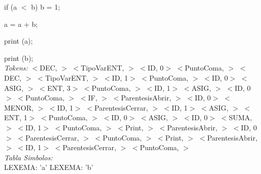 \documentclass[a4paper, 12pt]{article}
\begin{document}
 if (a  $<$  b) b  =  1;
 
 a = a  +  b;
 
print (a);

print (b);
\medskip\\
\emph{Tokens:}
 $<$DEC, $>$ 
 $<$TipoVarENT, $>$ 
 $<$ID, 0$>$ 
 $<$PuntoComa, $>$ 
 $<$DEC, $>$ 
 $<$TipoVarENT, $>$ 
 $<$ID, 1$>$ 
 $<$PuntoComa, $>$ 
 $<$ID, 0$>$ 
 $<$ASIG, $>$ 
 $<$ENT, 3$>$ 
 $<$PuntoComa, $>$ 
 $<$ID, 1$>$ 
 $<$ASIG, $>$ 
 $<$ID, 0$>$ 
 $<$PuntoComa, $>$ 
 $<$IF, $>$ 
 $<$ParentesisAbrir, $>$ 
 $<$ID, 0$>$ 
 $<$MENOR, $>$ 
 $<$ID, 1$>$
 $<$ParentesisCerrar, $>$ 
 $<$ID, 1$>$ 
 $<$ASIG, $>$ 
 $<$ENT, 1$>$ 
 $<$PuntoComa, $>$ 
 $<$ID, 0$>$ 
 $<$ASIG, $>$ 
 $<$ID, 0$>$ 
 $<$SUMA, $>$ 
 $<$ID, 1$>$ 
 $<$PuntoComa, $>$ 
 $<$Print, $>$ 
 $<$ParentesisAbrir, $>$ 
 $<$ID, 0$>$ 
 $<$ParentesisCerrar, $>$ 
 $<$PuntoComa, $>$ 
 $<$Print, $>$ 
 $<$ParentesisAbrir, $>$ 
 $<$ID, 1$>$ 
 $<$ParentesisCerrar, $>$ 
 $<$PuntoComa, $>$\medskip\\
\emph{Tabla Simbolos:}\\ 
  LEXEMA: 'a'
  LEXEMA: 'b' 
\end{document}
